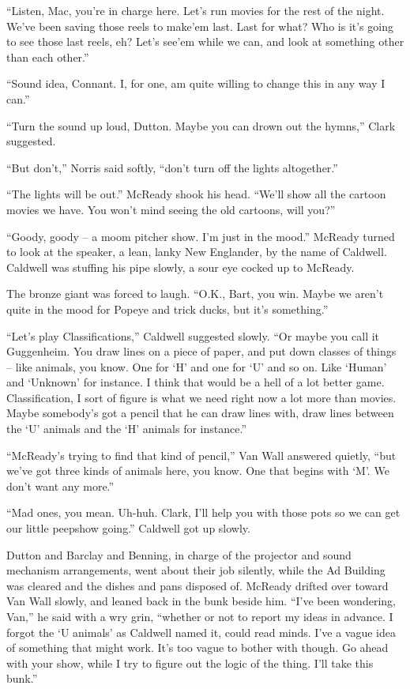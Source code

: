 \documentclass[letterpaper,openany,12pt]{memoir}		%
\begin{document}
``Listen, Mac, you're in charge here. Let's run movies for the rest of the
night. We've been saving those reels to make'em last. Last for what? Who is it's
going to see those last reels, eh? Let's see'em while we can, and look at
something other than each other.''

``Sound idea, Connant. I, for one, am quite willing to change this in any way I
can.''

``Turn the sound up loud, Dutton. Maybe you can drown out the hymns,'' Clark
suggested.

``But don't,'' Norris said softly, ``don't turn off the lights altogether.''

``The lights will be out.'' McReady shook his head. ``We'll show all the cartoon
movies we have. You won't mind seeing the old cartoons, will you?''

``Goody, goody -- a moom pitcher show. I'm just in the mood.'' McReady turned to
look at the speaker, a lean, lanky New Englander, by the name of Caldwell.
Caldwell was stuffing his pipe slowly, a sour eye cocked up to McReady.

The bronze giant was forced to laugh. ``O.K., Bart, you win. Maybe we aren't
quite in the mood for Popeye and trick ducks, but it's something.''

``Let's play Classifications,'' Caldwell suggested slowly. ``Or maybe you call
it Guggenheim. You draw lines on a piece of paper, and put down classes of
things -- like animals, you know. One for `H' and one for `U' and so on. Like
`Human' and `Unknown' for instance. I think that would be a hell of a lot better
game. Classification, I sort of figure is what we need right now a lot more than
movies. Maybe somebody's got a pencil that he can draw lines with, draw lines
between the `U' animals and the `H' animals for instance.''

``McReady's trying to find that kind of pencil,'' Van Wall answered quietly,
``but we've got three kinds of animals here, you know. One that begins with `M'.
We don't want any more.''

``Mad ones, you mean. Uh-huh. Clark, I'll help you with those pots so we can get
our little peepshow going.'' Caldwell got up slowly.

Dutton and Barclay and Benning, in charge of the projector and sound mechanism
arrangements, went about their job silently, while the Ad Building was cleared
and the dishes and pans disposed of. McReady drifted over toward Van Wall
slowly, and leaned back in the bunk beside him. ``I've been wondering, Van,'' he
said with a wry grin, ``whether or not to report my ideas in advance. I forgot
the `U animals' as Caldwell named it, could read minds. I've a vague idea of
something that might work. It's too vague to bother with though. Go ahead with
your show, while I try to figure out the logic of the thing. I'll take this
bunk.''
\end{document}
